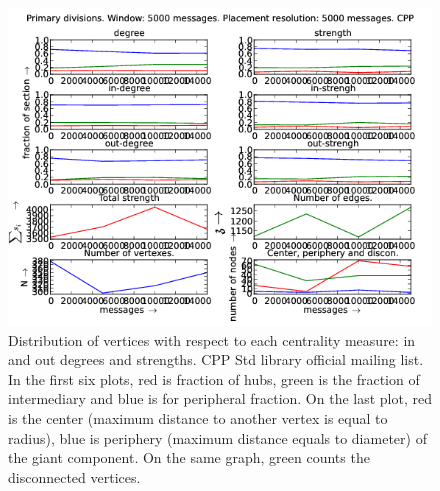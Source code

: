 \documentclass[%
 aip,
 jmp,%
 amsmath,amssymb,
 reprint,%
]{revtex4-1}
\begin{document}
\begin{figure}[hbtp] 
   \centering
        \includegraphics[width=\textwidth]{figs/CPP/5000}
    \caption{Distribution of vertices with respect to each centrality measure: in and out degrees and strengths. CPP Std library official mailing list. In the first six plots, red is fraction of hubs, green is the fraction of intermediary and blue is for peripheral fraction. On the last plot, red is the center (maximum distance to another vertex is equal to radius), blue is periphery (maximum distance equals to diameter) of the giant component. On the same graph, green counts the disconnected vertices.}
    \label{fig:cpp5000}
\end{figure}
\end{document}

